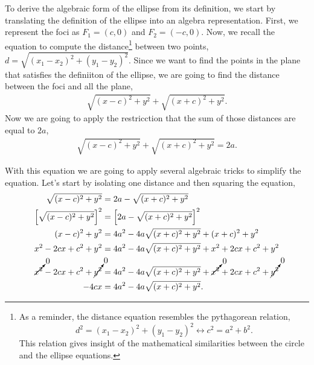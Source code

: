 \documentclass[../main-notes.tex]{subfiles}
\begin{document}
To derive the algebraic form of the ellipse from its definition, we start by translating the definition of the ellipse into an algebra representation.
First, we represent the foci as $F_1=(c,0)$ and $F_2=(-c,0)$.
Now, we recall the equation to compute the distance\footnote{As a reminder, the distance equation resembles the pythagorean relation, \[d^2 = (x_1-x_2)^2 + (y_1-y_2)^2 \longleftrightarrow c^2 = a^2+b^2.\]
This relation gives insight of the mathematical similarities between the circle and the ellipse equations.
} between two points, $d=\sqrt{(x_1-x_2)^2+(y_1-y_2)^2}$.
Since we want to find the points in the plane that satisfies the definiiton of the ellipse, we are going to find the distance between the foci and all the plane,
\begin{gather*}
    \sqrt{(x-c)^2+y^2} + \sqrt{(x+c)^2+y^2}.
\end{gather*}
Now we are going to apply the restricction that the sum of those distances are equal to $2a$,
\begin{gather*}
    \sqrt{(x-c)^2+y^2} + \sqrt{(x+c)^2+y^2} = 2a.
\end{gather*}

With this equation we are going to apply several algebraic tricks to simplify the equation.
Let's start by isolating one distance and then squaring the equation,
\begin{align*}
    \sqrt{(x-c)^2+y^2} &= 2a - \sqrt{(x+c)^2+y^2} \\
    \qty[\sqrt{(x-c)^2+y^2}]^2 &= \qty[2a - \sqrt{(x+c)^2+y^2}]^2 \\
    (x-c)^2+y^2 &= 4a^2 -4a\sqrt{(x+c)^2+y^2} + (x+c)^2+y^2 \\
    x^2-2cx+c^2+y^2 &= 4a^2 -4a\sqrt{(x+c)^2+y^2} + x^2 +2cx +c^2 +y^2\\
    \cancelto{0}{x^2}
    -2cx+c^2
    +\cancelto{0}{y^2} &= 4a^2 -4a\sqrt{(x+c)^2+y^2} + \cancelto{0}{x^2} +2cx +c^2 +\cancelto{0}{y^2}\\
    -4cx &= 4a^2 -4a\sqrt{(x+c)^2+y^2}.
\end{align*}
\end{document}
